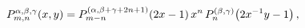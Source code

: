 \[\mathop{P^{\alpha,\beta,\gamma}_{m,n}\/}\nolimits\!\left(x,y\right)=\mathop{P^%
{(\alpha,\beta+\gamma+2n+1)}_{m-n}\/}\nolimits\!\left(2x-1\right)\*x^{n}%
\mathop{P^{(\beta,\gamma)}_{n}\/}\nolimits\!\left(2x^{-1}y-1\right),\]